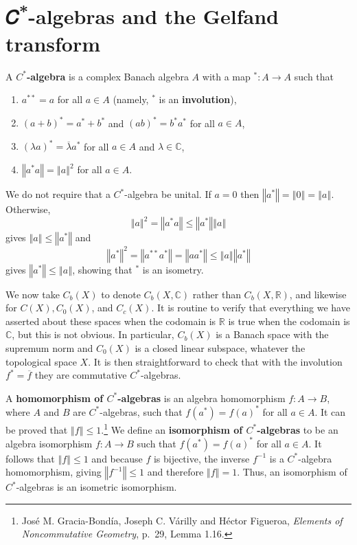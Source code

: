 \documentclass{article}
\newcommand{\norm}[1]{\left\Vert #1 \right\Vert}
\theoremstyle{definition}
\begin{document}
\section{𝐶\textsuperscript{*}-algebras and the Gelfand transform}
A \textbf{$C^*$-algebra} is a complex Banach algebra $A$
with a map $^*:A \to A$ such
that
\begin{enumerate}
\item $a^{**}=a$ for all $a \in A$ (namely, $^*$ is an \textbf{involution}),
\item $(a+b)^*=a^*+b^*$ and $(ab)^*=b^*a^*$ for all $a \in A$,
\item $(\lambda a)^* = \overline{\lambda} a^*$ for all $a \in A$ and $\lambda \in \mathbb{C}$,
\item $\norm{a^*a}=\norm{a}^2$ for all $a \in A$.
\end{enumerate}
We do not require that a $C^*$-algebra be unital. 
If $a=0$ then $\norm{a^*}=\norm{0}=\norm{a}$. 
Otherwise,
\[
\norm{a}^2=\norm{a^*a} \leq \norm{a^*} \norm{a}
\]
gives $\norm{a} \leq \norm{a^*}$ and
\[
\norm{a^*}^2 = \norm{a^{**}a^*} = \norm{aa^*} \leq \norm{a}\norm{a^*}
\]
gives $\norm{a^*} \leq \norm{a}$, showing that $^*$ is an isometry. 



We now take $C_b(X)$ to denote $C_b(X,\mathbb{C})$ rather than $C_b(X,\mathbb{R})$, and likewise for $C(X), C_0(X)$, and $C_c(X)$. 
It is routine   to verify that everything we have asserted about these spaces when the codomain is $\mathbb{R}$ is
true
when the codomain is $\mathbb{C}$, but this is not obvious. In particular, $C_b(X)$ is a Banach space with the supremum norm and $C_0(X)$ is a closed linear subspace, 
whatever the topological space $X$. It is then straightforward to check that with the involution $f^*= \overline{f}$ they
are commutative $C^*$-algebras. 


A \textbf{homomorphism of $C^*$-algebras} is an algebra homomorphism $f:A \to B$, where $A$ and $B$ are $C^*$-algebras, such that
$f(a^*)=f(a)^*$ for all $a \in A$. It can be proved that $\norm{f} \leq 1$.\footnote{Jos\'e M. Gracia-Bond\'ia, Joseph C. V\'arilly and
H\'ector Figueroa, {\em Elements of Noncommutative Geometry}, p.~29, Lemma 1.16.} We define an
\textbf{isomorphism of $C^*$-algebras} to be an algebra isomorphism $f:A \to B$ such that
$f(a^*)=f(a)^*$ for all $a \in A$. It follows that $\norm{f} \leq 1$ and because $f$ is bijective, the inverse $f^{-1}$ is a $C^*$-algebra homomorphism,
giving $\norm{f^{-1}} \leq 1$ and therefore $\norm{f}=1$. Thus, an isomorphism of $C^*$-algebras is an isometric isomorphism.
\end{document}
